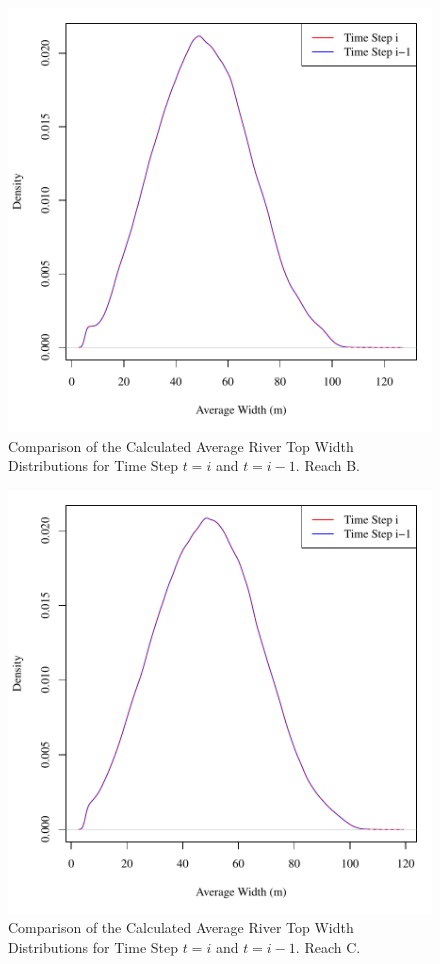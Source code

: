 \begin{figure}[htbp]
\begin{center}
	\includegraphics[width=6in]{"Figures/Results_USR/G widthToday B"}
	\caption{Comparison of the Calculated Average River Top Width Distributions for Time Step $t=i$ and $t=i-1$.  Reach B.}
\end{center}
\end{figure}

\begin{figure}[htbp]
\begin{center}
	\includegraphics[width=6in]{"Figures/Results_USR/G widthToday C"}
	\caption{Comparison of the Calculated Average River Top Width Distributions for Time Step $t=i$ and $t=i-1$.  Reach C.}
\end{center}
\end{figure}

